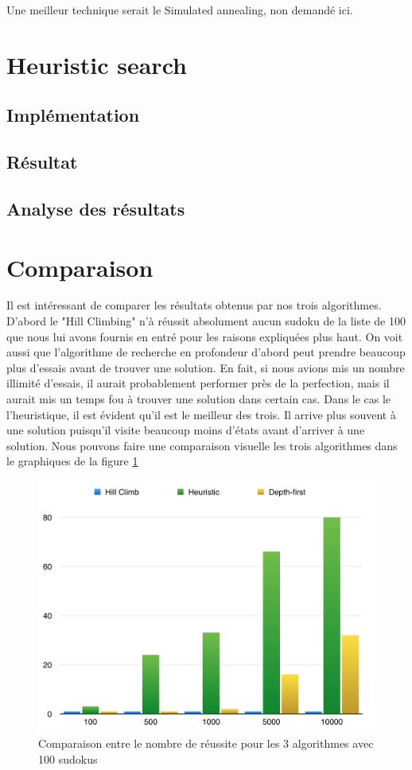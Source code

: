 \documentclass[a4paper,10pt]{article}
\begin{document}
Une meilleur technique serait le Simulated annealing, non demandé ici. 
\section{Heuristic search}

\subsection{Implémentation}
\subsection{Résultat}
\subsection{Analyse des résultats}


\section{Comparaison}
Il est intéressant de comparer les résultats obtenus par nos trois algorithmes. D'abord le "Hill Climbing" n'à réussit absolument aucun sudoku de la liste de 100 que nous lui avons fournis en entré pour les raisons expliquées plus haut. On voit aussi que l'algorithme de recherche en profondeur d'abord peut prendre beaucoup plus d'essais avant de trouver une solution. En fait, si nous avions mis un nombre illimité d'essais, il aurait probablement performer près de la perfection, mais il aurait mis un temps fou à trouver une solution dans certain cas. Dans le cas le l'heuristique, il est évident qu'il est le meilleur des trois. Il arrive plus souvent à une solution puisqu'il visite beaucoup moins d'états avant d'arriver à une solution. Nous pouvons faire une comparaison visuelle les trois algorithmes dans le graphiques de la figure \ref{fig:comp} \\

\begin{figure}[h]
	\includegraphics[width=12cm]{images/comparaison.png} 
	\centering
	\caption{Comparaison entre le nombre de réussite pour les 3 algorithmes avec 100 sudokus}
	\label{fig:comp}
\end{figure}
\end{document}
